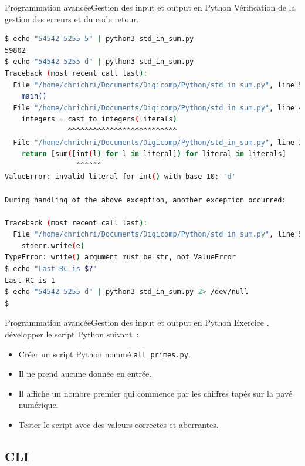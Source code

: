 \documentclass{beamer}
\begin{document}
    \begin{frame}[fragile]{Programmation avancée}{Gestion des input et output en Python}
        Vérification de la gestion des erreurs et du code retour.
        \begin{lstlisting}[language=Bash,basicstyle=\tiny\ttfamily]
$ echo "54542 5255 5" | python3 std_in_sum.py
59802
$ echo "54542 5255 d" | python3 std_in_sum.py
Traceback (most recent call last):
  File "/home/chrichri/Documents/Digicomp/Python/std_in_sum.py", line 53, in <module>
    main()
  File "/home/chrichri/Documents/Digicomp/Python/std_in_sum.py", line 46, in main
    integers = cast_to_integers(literals)
               ^^^^^^^^^^^^^^^^^^^^^^^^^^
  File "/home/chrichri/Documents/Digicomp/Python/std_in_sum.py", line 37, in cast_to_integers
    return [sum([int(l) for l in literal]) for literal in literals]
                 ^^^^^^
ValueError: invalid literal for int() with base 10: 'd'

During handling of the above exception, another exception occurred:

Traceback (most recent call last):
  File "/home/chrichri/Documents/Digicomp/Python/std_in_sum.py", line 56, in <module>
    stderr.write(e)
TypeError: write() argument must be str, not ValueError
$ echo "Last RC is $?"
Last RC is 1
$ echo "54542 5255 d" | python3 std_in_sum.py 2> /dev/null
$
        \end{lstlisting}
    \end{frame}

    \begin{frame}{Programmation avancée}{Gestion des input et output en Python}
        Exercice \execcounterdispinc{}, développer le script Python suivant~:
        \begin{itemize}
            \item Créer un script Python nommé \lstinline{all_primes.py}.
            \item Il ne prend aucune donnée en entrée.
            \item Il affiche un nombre premier qui commence par les chiffres tapés sur la pavé numérique.
            \item Tester le script avec des valeurs correctes et aberrantes.
        \end{itemize}
    \end{frame}

    \subsection{CLI}\label{subsec:cli}
\end{document}
